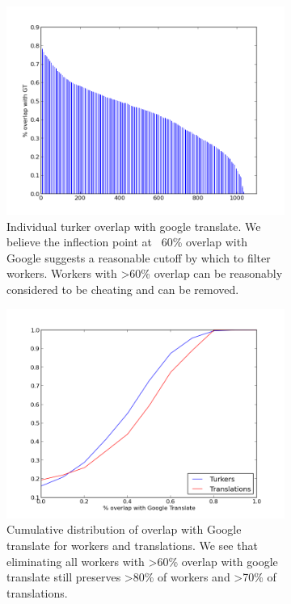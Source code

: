 \documentclass[11pt]{article}
\begin{document}
\begin{figure}
\centering
\begin{subfigure}[b]{1\linewidth}
\includegraphics[width=\textwidth]{../version1-figures/turker-googmatch-distribution.png}
\caption{Individual turker overlap with google translate. We believe the inflection point at ~60\% overlap with Google suggests a reasonable cutoff by which to filter workers. Workers with \textgreater 60\% overlap can be reasonably considered to be cheating and can be removed.}                
\label{dist}
\end{subfigure}
\begin{subfigure}[b]{1\linewidth}
\includegraphics[width=\textwidth]{../version1-figures/google-cdf-googlangs.png}
\caption{Cumulative distribution of overlap with Google translate for workers and translations. We see that eliminating all workers with \textgreater 60\% overlap with google translate still preserves \textgreater 80\% of workers and \textgreater 70\% of translations.}
\label{cdf}
\end{subfigure}
\caption{}\label{cheaters}
\end{figure}
\end{document}
